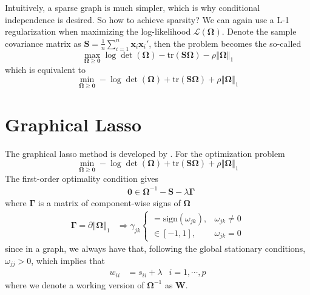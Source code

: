 \documentclass[twoside]{article}
\begin{document}
Intuitively, a sparse graph is much simpler, which is why conditional independence is desired. So how to achieve sparsity? We can again use a L-1 regularization when maximizing the log-likelihood $\mathcal{L}(\boldsymbol{\Omega})$. Denote the sample covariance matrix as $\mathbf{S} = \frac{1}{n}\sum^n_{i=1}\mathbf{x}_i\mathbf{x}_i'$, then the problem becomes the so-called 
$$
\max_{\boldsymbol{\Omega}\geq \mathbf{0}}\log \det (\boldsymbol{\Omega}) - \mathrm{tr}(\mathbf{S}\boldsymbol{\Omega}) - \rho\left\Vert \boldsymbol{\Omega} \right\Vert _1
$$
which is equivalent to 
$$
\min_{\boldsymbol{\Omega}\geq \mathbf{0}} -\log \det (\boldsymbol{\Omega}) + \mathrm{tr}(\mathbf{S}\boldsymbol{\Omega}) +\rho\left\Vert \boldsymbol{\Omega} \right\Vert _1
$$

\section{Graphical Lasso}
The graphical lasso method is developed by \citep{friedman2008sparse}. For the optimization problem 
\begin{equation}
    \min_{\boldsymbol{\Omega}\geq \mathbf{0}} -\log \det (\boldsymbol{\Omega}) + \mathrm{tr}(\mathbf{S}\boldsymbol{\Omega}) +\rho\left\Vert \boldsymbol{\Omega} \right\Vert _1 
\end{equation}
The first-order optimality condition gives
\begin{align*}
    &\mathbf{0} \in \boldsymbol{\Omega}^{-1} - \mathbf{S} -\lambda \boldsymbol{\Gamma}
\end{align*}
where $\boldsymbol{\Gamma}$ is a matrix of component-wise signs of $\boldsymbol{\Omega}$
\begin{align*}
    \boldsymbol{\Gamma} = \partial \left\Vert \boldsymbol{\Omega} \right\Vert _1 & \Rightarrow \gamma_{jk} \begin{cases}
        = \text{sign}(\omega_{jk}), &\omega_{jk}\neq 0\\
        \in  [-1,1], &\omega_{jk}=0
    \end{cases}
\end{align*}
since in a graph, we always have that, following the global stationary conditions, $\omega_{jj}>0$, which implies that 
\begin{align*}
    w_{ii} &= s_{ii} + \lambda & i=1,\cdots,p
\end{align*}
where we denote a working version of $\boldsymbol{\Omega}^{-1}$ as $\mathbf{W}$.
\end{document}
